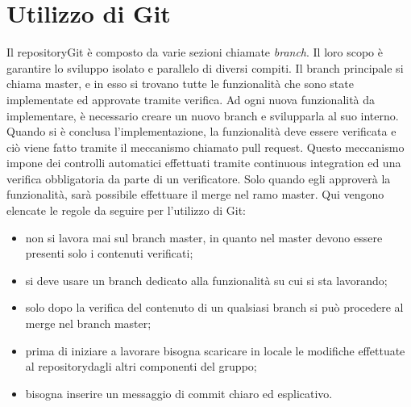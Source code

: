\section{Utilizzo di Git}
Il repository\glosp Git è composto da varie sezioni chiamate \textit{branch}. Il loro scopo è garantire lo sviluppo isolato e parallelo di diversi compiti. Il branch principale si chiama master, e in esso si trovano tutte le funzionalità che sono state implementate ed approvate tramite verifica. Ad ogni nuova funzionalità da implementare, è necessario creare un nuovo branch e svilupparla al suo interno. Quando si è conclusa l'implementazione, la funzionalità deve essere verificata e ciò viene fatto tramite il meccanismo chiamato pull request. Questo meccanismo impone dei controlli automatici effettuati tramite continuous integration ed una verifica obbligatoria da parte di un verificatore. Solo quando egli approverà la funzionalità, sarà possibile effettuare il merge nel ramo master.
Qui vengono elencate le regole da seguire per l'utilizzo di Git:
\begin{itemize}
	\item non si lavora mai sul branch master, in quanto nel master devono essere presenti solo i contenuti verificati;
	\item si deve usare un branch dedicato alla funzionalità su cui si sta lavorando;
	\item solo dopo la verifica del contenuto di un qualsiasi branch si può procedere al merge nel branch master;
	\item prima di iniziare a lavorare bisogna scaricare in locale le modifiche effettuate al repository\glosp dagli altri componenti del gruppo;
	\item bisogna inserire un messaggio di commit chiaro ed esplicativo.
\end{itemize}
